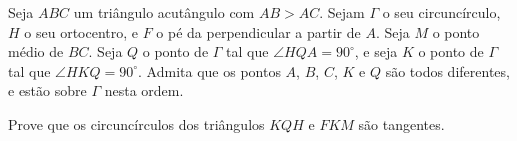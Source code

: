 Seja $ABC$ um triângulo acutângulo com $AB > AC$. Sejam $\Gamma$ o seu circuncírculo, $H$ o seu ortocentro, e $F$ o pé da perpendicular a partir de $A$. Seja $M$ o ponto médio de $BC$. Seja $Q$ o ponto de $\Gamma$ tal que $\angle HQA = 90^{\circ}$, e seja $K$ o ponto de $\Gamma$ tal que $\angle HKQ = 90^{\circ}$. Admita que os pontos $A$,  $B$,  $C$,  $K$ e $Q$ são todos diferentes, e estão sobre $\Gamma$ nesta ordem.

Prove que os circuncírculos dos triângulos $KQH$ e $FKM$ são tangentes.
